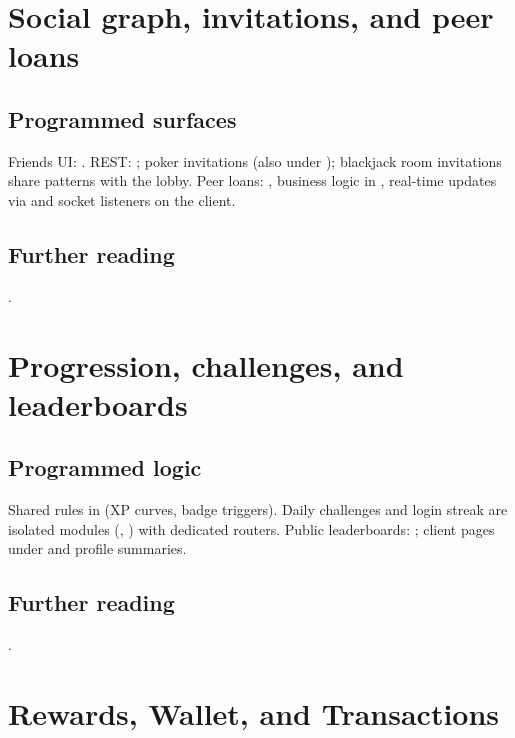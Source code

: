 \documentclass[11pt,a4paper]{article}
\begin{document}
\section{Social graph, invitations, and peer loans}
\label{app:social}

\subsection{Programmed surfaces}

Friends UI: . REST: ; poker invitations  (also under ); blackjack room invitations share patterns with the lobby. Peer loans: , business logic in , real-time updates via  and socket listeners on the client.

\subsection{Further reading}

.

\section{Progression, challenges, and leaderboards}
\label{app:prog}

\subsection{Programmed logic}

Shared rules in  (XP curves, badge triggers). Daily challenges and login streak are isolated modules (, ) with dedicated routers. Public leaderboards: ; client pages under  and profile summaries.

\subsection{Further reading}

.

\section{Rewards, Wallet, and Transactions}
\label{app:rewards}
\end{document}
